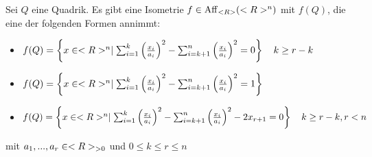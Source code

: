 \begin{theorem}
	Sei $Q$ eine Quadrik. Es gibt eine Isometrie $f\in\operatorname{Aff}_{<R>}(<R>^n)$ mit $f(Q)$, die eine der folgenden Formen annimmt:
	\begin{itemize}
		\item $f(Q)=\left\lbrace x\in<R>^n\mid \sum_{i=1}^k \left( \frac{x_i}{a_i}\right)^2 -\sum_{i=k+1}^{n} \left( \frac{x_i}{a_i}\right)^2=0\right\rbrace \quad k\ge r-k\notag$
		\item $f(Q)=\left\lbrace x\in<R>^n\mid \sum_{i=1}^k \left( \frac{x_i}{a_i}\right)^2 -\sum_{i=k+1}^{n} \left( \frac{x_i}{a_i}\right)^2=1\right\rbrace\notag$
		\item $f(Q)=\left\lbrace x\in<R>^n\mid \sum_{i=1}^k \left( \frac{x_i}{a_i}\right)^2 -\sum_{i=k+1}^{n} \left( \frac{x_i}{a_i}\right)^2-2x_{r+1}=0\right\rbrace \quad k\ge r-k, r<n\notag$
	\end{itemize}
	mit $a_1,...,a_r\in<R>_{>0}$ und $0\le k\le r\le n$
\end{theorem}
